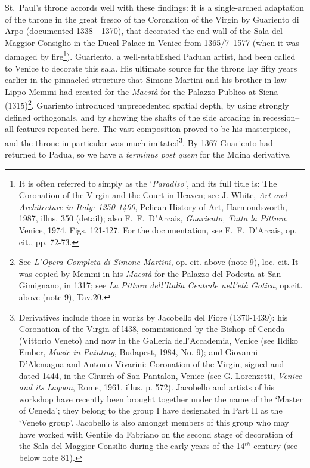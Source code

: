 \documentclass[a4paper,12pt]{article}
\begin{document}
St.~Paul's throne accords well with these findings: it is a
single-arched adaptation of the throne in the great fresco of the
Coronation of the Virgin by Guariento di Arpo (documented 1338 -
1370), that decorated the end wall of the Sala del Maggior Consiglio
in the Ducal Palace in Venice from 1365/7--1577 (when it was damaged
by fire\footnote{It is often referred to simply as the
`\textit{Paradiso'}, and its full title is: The Coronation of the
Virgin and the Court in Heaven; see J. White, \textit{Art and
Architecture in Italy: 1250-1400}, Pelican History of Art,
Harmondsworth, 1987, illus. 350 (detail); also F.~F.~D'Arcais,
\textit{Guariento, Tutta la Pittura}, Venice, 1974, Figs. 121-127.
For the documentation, see F.~F.~D'Arcais, op. cit., pp. 72-73.}).
Guariento, a well-established Paduan artist, had been called to Venice
to decorate this sala. His ultimate source for the throne lay fifty
years earlier in the pinnacled structure that Simone Martini and his
brother-in-law Lippo Memmi had created for the \textit{Maest\`a} for the
Palazzo Publico at Siena (1315)\footnote{See \textit{L'Opera Completa
di Simone Martini}, op. cit. above (note 9), loc. cit. It was copied
by Memmi in his \textit{Maest\`a} for the Palazzo del Podesta at San
Gimignano, in 1317; see \textit{La Pittura dell'Italia Centrale
nell'et\`a Gotica}, op.cit. above (note 9), Tav.20.}. Guariento
introduced unprecedented spatial depth, by using strongly defined
orthogonals, and by showing the shafts of the side arcading in
recession--all features repeated here.  The vast composition proved
to be his masterpiece, and the throne in particular was much
imitated\footnote{Derivatives include those in works by Jacobello del
Fiore (1370-1439): his Coronation of the Virgin of l438, commissioned
by the Bishop of Ceneda (Vittorio Veneto) and now in the Galleria
dell'Accademia, Venice (see Ildiko Ember, \textit{Music in Painting},
Budapest, 1984, No. 9); and Giovanni D'Alemagna and Antonio Vivarini:
Coronation of the Virgin, signed and dated 1444, in the Church of San
Pantalon, Venice (see G. Lorenzetti, \textit{Venice and its Lagoon},
Rome, 1961, illus. p. 572). Jacobello and artists of his workshop have
recently been brought together under the name of the `Master of
Ceneda'; they belong to the group I have designated in Part II as the
`Veneto group'. Jacobello is also amongst members of this group who
may have worked with Gentile da Fabriano on the second stage of
decoration of the Sala del Maggior Consilio during the early years of
the 14$^{th}$ century (see below note 81).}. By 1367 Guariento had
returned to Padua, so we have a \textit{terminus post quem} for the
Mdina derivative.
\end{document}
